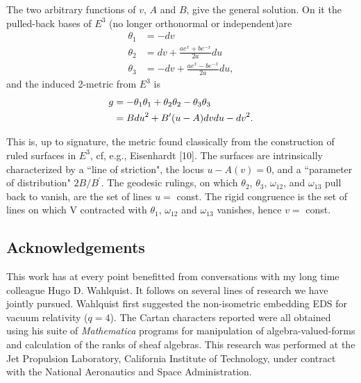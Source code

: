 \documentclass[a4paper,a4paper]{article}
\begin{document}
        The two arbitrary functions of $v$,  $A$ and $B$,  give the
general solution. On it the pulled-back bases of ${E^3}$ (no longer
orthonormal or independent)are
\begin{align}
{{\theta }_1} &= - {dv}  \\
{{\theta }_2} &= {dv} +\frac{a {e^x}+b {e^{-x}}}{2 a}{du}  \\
{{\theta }_3} &= - {dv} +\frac{a {e^x}-b {e^{-x}}}{2 a}{du},
\end{align}
and the induced  2-metric from \({E^3}\) is
\begin{align}
g &= - {{\theta }_1}{{\theta }_1}+{{\theta }_2}{{\theta }_2}-{{\theta
}_3}{{\theta }_3}  \\
&= B {{{du}}^2}+{B^ \prime }(u-A){dv} {du}- {{{dv}}^2}.\notag
\end{align}

This is,  up to signature,  the metric found classically
from the construction of ruled surfaces in \({E^3}\),  cf, e.g.,
Eisenhardt
[10].  The  surfaces are intrinsically characterized by a ``line of
striction",  the locus $u-A(v) = 0$,  and a ``parameter of
distribution"  $2B/{B^{\prime
}}$.  The  geodesic rulings,  on which ${{\theta }_2}$,  ${{\theta }_3}$,
${{\omega }_{12}}$,  and ${{\omega }_{13}}$ pull back
to vanish,  are the set of lines $u =$ const.  The rigid congruence is
the set of lines on which V contracted with ${\theta }_{1}$,  ${\omega
}_{12}$ and ${\omega }_{13}$ vanishes,  hence $v =$ const.

\subsection*{Acknowledgements}

This work has at every point benefitted from conversations with my long
time colleague Hugo D. Wahlquist.  It follows on several lines of
research we have jointly pursued.  Wahlquist first suggested the non-isometric
embedding EDS for vacuum relativity ($q = 4$).  The Cartan characters
reported were all obtained using his suite of {\itshape Mathematica} programs for
manipulation of algebra-valued-forms and calculation of the ranks of
sheaf algebras.  This research was performed at the Jet Propulsion
Laboratory,  California Institute of Technology,  under contract with
the National Aeronautics and Space Administration.
\end{document}
